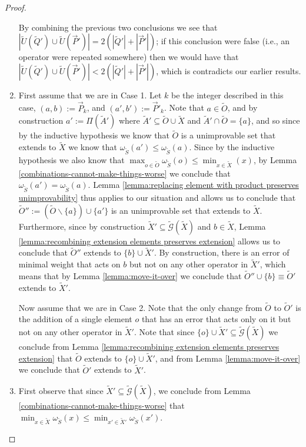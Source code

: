 \documentclass[12pt]{amsbook}
\theoremstyle{plain}
\theoremstyle{definition}
\theoremstyle{remark}
\newcommand{\lst}{\vec}
\newcommand{\set}{\tilde}
\newcommand{\genfun}{\tilde{\mathcal{G}}}
\newcommand{\om}{\omega}
\newcommand{\paren}[1]{\left(#1\right)}
\begin{document}
\begin{proof}
\begin{enumerate}
By combining the previous two conclusions we see that $|\set U(\set Q')\cup\set U(\lst P')|=2(|\set Q'|+|\lst P'|)$;  if this conclusion were false (i.e., an operator were repeated somewhere) then we would have that $|\set U(\set Q')\cup\set U(\lst P')|<2(|\set Q'|+|\lst P'|)$, which is contradicts our earlier results.
\item

First assume that we are in Case 1.  Let $k$ be the integer described in this case, $(a,b):=\lst P_k$, and $(a',b'):=\lst P'_k$.  Note that $a\in\set O$, and by construction $a':=\Pi(\set A')$ where $\set A'\subseteq \set O\cup\set X$ and $\set A'\cap\set O=\{a\}$, and so since by the inductive hypothesis we know that $\set O$ is a unimprovable set that extends to $\set X$ we know that $\om_{\set S}(a')\le\om_{\set S}(a)$.  Since by the inductive hypothesis we also know that $\max_{o\in\set O}\om_{\set S}(o)\le\min_{x\in\set X}(x)$, by Lemma \ref{combinations-cannot-make-things-worse} we conclude that $\om_{\set S}(a')=\om_{\set S}(a)$.  Lemma \ref{lemma:replacing element with product preserves unimprovability} thus applies to our situation and allows us to conclude that $\set O'':=\paren{\set O\backslash\{a\}}\cup\{a'\}$ is an unimprovable set that extends to $\set X$.  Furthermore, since by construction $\set X'\subseteq\genfun(\set X)$ and $b\in\set X$, Lemma \ref{lemma:recombining extension elements preserves extension} allows us to conclude that $\set O''$ extends to $\{b\}\cup\set X'$.  By construction, there is an error of minimal weight that acts on $b$ but not on any other operator in $\set X'$, which means that by Lemma \ref{lemma:move-it-over} we conclude that $\set O''\cup\{b\}\equiv\set O'$ extends to $\set X'$.

Now assume that we are in Case 2.  Note that the only change from $\set O$ to $\set O'$ is the addition of a single element $o$ that has an error that acts only on it but not on any other operator in $\set X'$.  Note that since $\{o\}\cup\set X'\subseteq\genfun(\set X)$ we conclude from Lemma \ref{lemma:recombining extension elements preserves extension} that $\set O$ extends to $\{o\}\cup\set X'$, and from Lemma \ref{lemma:move-it-over} we conclude that $\set O'$ extends to $\set X'$.
\item

First observe that since $\set X'\subseteq\genfun(\set X)$, we conclude from Lemma \ref{combinations-cannot-make-things-worse} that $\min_{x\in\set X}\om_{\set S}(x)\le\min_{x'\in\set X'}\om_{\set S}(x')$.


\end{enumerate}
\end{proof}
\end{document}
